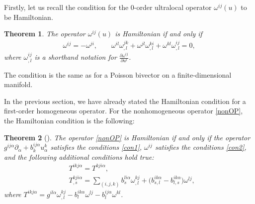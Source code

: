 \documentclass[pdftex]{sigma}
\numberwithin{equation}{section}
\newtheorem{Theorem}{Theorem}[section]
\begin{document}
Firstly, let us recall the condition for the 0-order ultralocal operator $\omega^{ij}(u)$ to be Hamiltonian.
\begin{Theorem}
The operator $\omega^{ij}(u)$ is Hamiltonian if and only if
\begin{gather}
\omega^{ij}=-\omega^{ji},\qquad
\omega^{il}\omega^{jk}_{,l}+\omega^{jl}\omega^{ki}_{,l}+\omega^{kl}\omega^{ij}_{,l}=0,\label{con2}
\end{gather}
where $\omega^{ij}_{,l}$ is a shorthand notation for $\frac{\partial \omega^{ij}}{\partial u^l}$.
\end{Theorem}
\begin{Remark}
The condition is the same as for a Poisson bivector on a finite-dimensional mani\-fold.
\end{Remark}

In the previous section, we have already stated the Hamiltonian condition for a first-order homogeneous operator. For the nonhomogeneous operator \eqref{nonOP}, the Hamiltonian condition is the following:
\begin{Theorem}[\cite{mokhov1995symplectic}]\label{theor5}
The operator \eqref{nonOP} is Hamiltonian if and only if the operator $g^{ij\alpha}\partial_\alpha+b^{ij\alpha}_ku^k_\alpha$ satisfies the conditions \eqref{con1}, $\omega^{ij}$ satisfies the conditions \eqref{con2}, and the following additional conditions hold true:
\begin{subequations}\label{con3}
\begin{align}
&T^{ikj\alpha} =T^{kji\alpha},\label{con3-1} \\
&T_{,s}^{kji\alpha} =\sum_{(i,j,k)}b_{s}^{li\alpha}\omega_{,l}^{kj}+\big(b_{s,l}^{ik\alpha}-b_{l,s}^{ik\alpha}\big)\omega^{lj}\label{con3-2},
\end{align}
\end{subequations}
where $T^{ikj\alpha}=g^{il\alpha}\omega^{kj}_{,l}-b^{ik\alpha}_l\omega^{lj}-b^{ij\alpha}_l\omega^{kl}$.
\end{Theorem}
\end{document}
